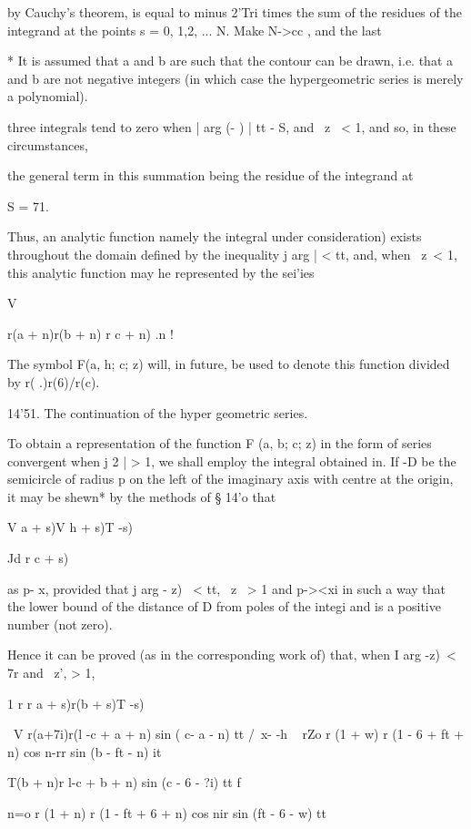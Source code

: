 by Cauchy's theorem, is equal to minus 2'Tri times the sum of the
residues of the integrand at the points s = 0, 1,2, ... N. Make N->cc
, and the last

* It is assumed that a and b are such that the contour can be drawn,
i.e. that a and b are not negative integers (in which case the
hypergeometric series is merely a polynomial).

%
%

three integrals tend to zero when | arg (- ) | tt - S, and \ z \ < 1,
and so, in these circumstances,

the general term in this summation being the residue of the integrand
at

S = 71.

Thus, an analytic function namely the integral under consideration)
exists throughout the domain defined by the inequality j arg | < tt,
and, when \ z\ < 1, this analytic function may he represented by the
sei'ies

V

r(a + n)r(b + n) r c + n) .n !

The symbol F(a, h; c; z) will, in future, be used to denote this
function divided by r( .)r(6)/r(c).

14'51. The continuation of the hyper geometric series.

To obtain a representation of the function F (a, b; c; z) in the form
of series convergent when j 2 | > 1, we shall employ the integral
obtained in. If -D be the semicircle of radius p on the left of
the imaginary axis with centre at the origin, it may be shewn* by the
methods of § 14'o that

V a + s)V h + s)T -s)

Jd r c + s)

as p- x, provided that j arg - z) \ < tt, \ z \ > 1 and p-><xi in
such a way that the lower bound of the distance of D from poles of the
integi and is a positive number (not zero).

Hence it can be proved (as in the corresponding work of) that,
when I arg -z)\ < 7r and \ z', > 1,

1 r r a + s)r(b + s)T -s)

\ V r(a+7i)r(l -c + a + n) sin ( c- a - n) tt /\ x- -h ~ rZo r (1 + w)
r (1 - 6 + ft + n) cos n-rr sin (b - ft - n) it

  T(b + n)r l-c + b + n) sin (c - 6 - ?i) tt f \

n=o r (1 + n) r (1 - ft + 6 + n) cos nir sin (ft - 6 - w) tt

